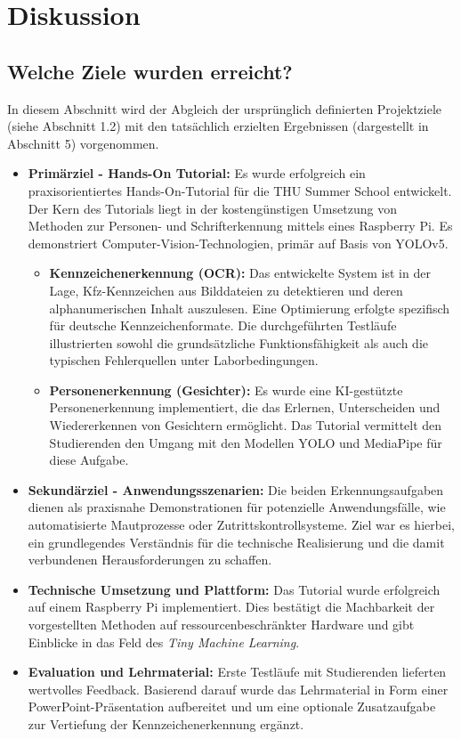 \section{Diskussion}

\subsection{Welche Ziele wurden erreicht?}
In diesem Abschnitt wird der Abgleich der ursprünglich definierten Projektziele (siehe Abschnitt 1.2) mit den tatsächlich erzielten Ergebnissen (dargestellt in Abschnitt 5) vorgenommen.

\begin{itemize}
    \item \textbf{Primärziel - Hands-On Tutorial:} Es wurde erfolgreich ein praxisorientiertes Hands-On-Tutorial für die THU Summer School entwickelt. Der Kern des Tutorials liegt in der kostengünstigen Umsetzung von Methoden zur Personen- und Schrifterkennung mittels eines Raspberry Pi. Es demonstriert Computer-Vision-Technologien, primär auf Basis von YOLOv5.
    \begin{itemize}
        \item \textbf{Kennzeichenerkennung (OCR):} Das entwickelte System ist in der Lage, Kfz-Kennzeichen aus Bilddateien zu detektieren und deren alphanumerischen Inhalt auszulesen. Eine Optimierung erfolgte spezifisch für deutsche Kennzeichenformate. Die durchgeführten Testläufe illustrierten sowohl die grundsätzliche Funktionsfähigkeit als auch die typischen Fehlerquellen unter Laborbedingungen.
        \item \textbf{Personenerkennung (Gesichter):} Es wurde eine KI-gestützte Personenerkennung implementiert, die das Erlernen, Unterscheiden und Wiedererkennen von Gesichtern ermöglicht. Das Tutorial vermittelt den Studierenden den Umgang mit den Modellen YOLO und MediaPipe für diese Aufgabe.
    \end{itemize}
    \item \textbf{Sekundärziel - Anwendungsszenarien:} Die beiden Erkennungsaufgaben dienen als praxisnahe Demonstrationen für potenzielle Anwendungsfälle, wie automatisierte Mautprozesse oder Zutrittskontrollsysteme. Ziel war es hierbei, ein grundlegendes Verständnis für die technische Realisierung und die damit verbundenen Herausforderungen zu schaffen.
    \item \textbf{Technische Umsetzung und Plattform:} Das Tutorial wurde erfolgreich auf einem Raspberry Pi implementiert. Dies bestätigt die Machbarkeit der vorgestellten Methoden auf ressourcenbeschränkter Hardware und gibt Einblicke in das Feld des \textit{Tiny Machine Learning}.
    \item \textbf{Evaluation und Lehrmaterial:} Erste Testläufe mit Studierenden lieferten wertvolles Feedback. Basierend darauf wurde das Lehrmaterial in Form einer PowerPoint-Präsentation aufbereitet und um eine optionale Zusatzaufgabe zur Vertiefung der Kennzeichenerkennung ergänzt.
\end{itemize}

